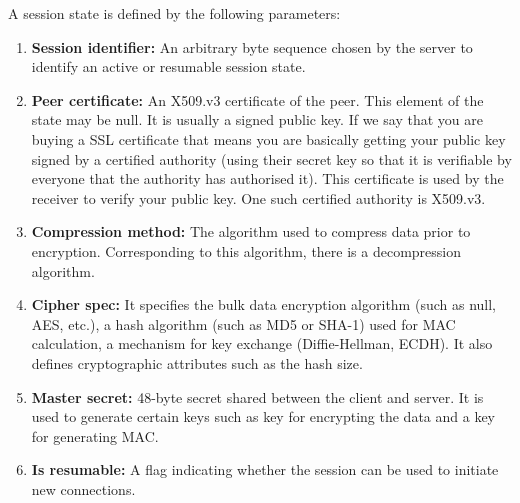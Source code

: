 \documentclass[11pt]{article}
\begin{document}
\newline
A session state is defined by the following parameters:
\begin{enumerate}
    \item \textbf{Session identifier:} An arbitrary byte sequence chosen by the server to identify an active or resumable session state. 
    \item \textbf{Peer certificate:} An X509.v3 certificate of the peer. This element of the state may be null. It is usually a signed public key. If we say that you are buying a SSL certificate that means you are basically getting your public key signed by a certified authority (using their secret key so that it is verifiable by everyone that the authority has authorised it). This certificate is used by the receiver to verify your public key. One such certified authority is X509.v3.
    \item \textbf{Compression method:} The algorithm used to compress data prior to encryption. Corresponding to this algorithm, there is a decompression algorithm.
    \item \textbf{Cipher spec:} It specifies the bulk data encryption algorithm (such as null, AES, etc.), a hash algorithm (such as MD5 or SHA-1) used for MAC calculation, a mechanism for key exchange (Diffie-Hellman, ECDH). It also defines cryptographic attributes such as the hash size.
    \item \textbf{Master secret:} 48-byte secret shared between the client and server. It is used to generate certain keys such as key for encrypting the data and a key for generating MAC.
    \item \textbf{Is resumable:} A flag indicating whether the session can be used to initiate new connections.
\end{enumerate}
\end{document}

